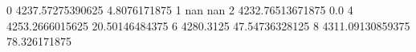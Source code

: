 0 4237.57275390625 4.8076171875
1 nan nan
2 4232.76513671875 0.0
4 4253.2666015625 20.50146484375
6 4280.3125 47.54736328125
8 4311.09130859375 78.326171875
